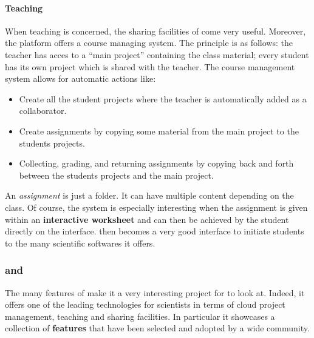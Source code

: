 \documentclass{deliverablereport}
\begin{document}
\paragraph{Teaching}

When teaching is concerned, the sharing facilities of \SMC come very
useful.  Moreover, the platform offers a course managing system. The
principle is as follows: the teacher has acces to a ``main project''
containing the class material; every student has its own project which
is shared with the teacher. The course management system allows for
automatic actions like:

\begin{itemize}
\item Create all the student projects where the teacher is
  automatically added as a collaborator.
\item Create assignments by copying some material from the main
  project to the students projects.
\item Collecting, grading, and returning assignments by copying back
  and forth between the students projects and the main project.
\end{itemize}

An \emph{assignment} is just a folder. It can have multiple content
depending on the class.  Of course, the system is especially
interesting when the assignment is given within an \textbf{interactive
  worksheet} and can then be achieved by the student directly on the
interface. \SMC then becomes a very good interface to initiate
students to the many scientific softwares it offers.

\subsubsection{\SMC and \ODK}

The many features of \SMC make it a very interesting project for \ODK
to look at. Indeed, it offers one of the leading technologies for
scientists in terms of cloud project management, teaching and sharing
facilities. In particular it showcases a collection of
\textbf{features} that have been selected and adopted by a wide
community.
\end{document}
